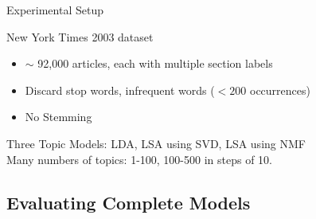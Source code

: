 \documentclass[compress]{beamer}
\begin{document}
\begin{frame}{Experimental Setup}
\begin{block}{New York Times 2003 dataset}
\begin{itemize}
\item $\sim$ 92,000 articles, each with multiple section labels
\item Discard stop words, infrequent words ($< 200$ occurrences)
\item No Stemming
\end{itemize}
\end{block}

Three Topic Models: LDA, LSA using SVD, LSA using NMF \\
Many numbers of topics: 1-100, 100-500 in steps of 10.

\end{frame}

\subsection{Evaluating Complete Models}
\end{document}
